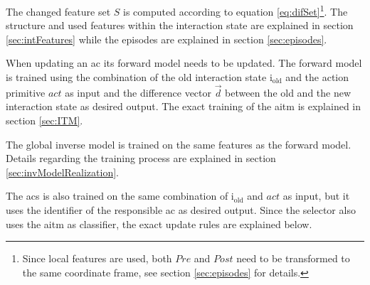 
The changed feature set $S$ is computed according to equation \ref{eq:difSet}\footnote{Since local features are used, both $Pre$ and $Post$ need to be transformed to the same coordinate frame, see section \ref{sec:episodes} for details.}. The structure and used features within the interaction state are explained in section \ref{sec:intFeatures} while the episodes are explained in section \ref{sec:episodes}.

When updating an \gls{ac} its forward model needs to be updated. The forward model is trained using the combination of the old interaction state  i$_\text{old}$ and the action primitive $act$ as input and the difference vector $\vec{d}$ between the old and the new interaction state as desired output. The exact training of the \gls{aitm} is explained in section \ref{sec:ITM}. 

The global inverse model is trained on the same features as the forward model. Details regarding the training process are explained in section \ref{sec:invModelRealization}.

The \gls{acs} is also trained on the same combination of i$_\text{old}$ and $act$ as input, but it uses the identifier of the responsible \gls{ac} as desired output.
Since the selector also uses the \gls{aitm} as classifier, the exact update rules are explained below.

